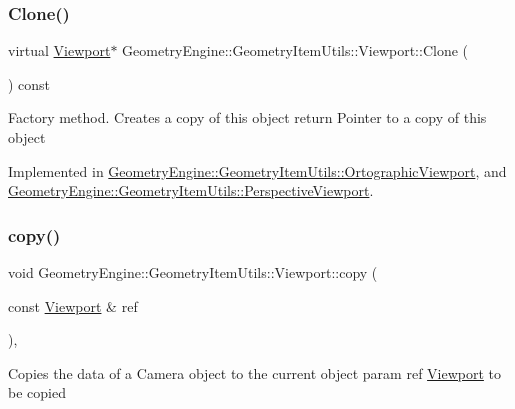 \subsubsection{\texorpdfstring{Clone()}{Clone()}}
{\footnotesize\ttfamily virtual \mbox{\hyperlink{class_geometry_engine_1_1_geometry_item_utils_1_1_viewport}{Viewport}}$\ast$ Geometry\+Engine\+::\+Geometry\+Item\+Utils\+::\+Viewport\+::\+Clone (\begin{DoxyParamCaption}{ }\end{DoxyParamCaption}) const\hspace{0.3cm}{\ttfamily [pure virtual]}}

Factory method. Creates a copy of this object return Pointer to a copy of this object 

Implemented in \mbox{\hyperlink{class_geometry_engine_1_1_geometry_item_utils_1_1_ortographic_viewport_a7729f7619d67c139f8510c305de1a286}{Geometry\+Engine\+::\+Geometry\+Item\+Utils\+::\+Ortographic\+Viewport}}, and \mbox{\hyperlink{class_geometry_engine_1_1_geometry_item_utils_1_1_perspective_viewport_a828a22e5d39e7c8d1812e97f582bf667}{Geometry\+Engine\+::\+Geometry\+Item\+Utils\+::\+Perspective\+Viewport}}.

\mbox{\label{class_geometry_engine_1_1_geometry_item_utils_1_1_viewport_a2cd0eeeac769d5da977a17a4e394a1d9}} 
\subsubsection{\texorpdfstring{copy()}{copy()}}
{\footnotesize\ttfamily void Geometry\+Engine\+::\+Geometry\+Item\+Utils\+::\+Viewport\+::copy (\begin{DoxyParamCaption}\item[{const \mbox{\hyperlink{class_geometry_engine_1_1_geometry_item_utils_1_1_viewport}{Viewport}} \&}]{ref }\end{DoxyParamCaption})\hspace{0.3cm}{\ttfamily [protected]}, {\ttfamily [virtual]}}

Copies the data of a Camera object to the current object param ref \mbox{\hyperlink{class_geometry_engine_1_1_geometry_item_utils_1_1_viewport}{Viewport}} to be copied \mbox{\label{class_geometry_engine_1_1_geometry_item_utils_1_1_viewport_a65f5f4ab19355462cb52127e7c1eb73d}} 
